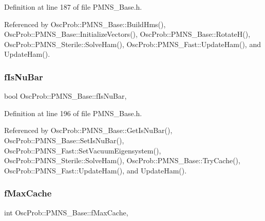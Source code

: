 Definition at line 187 of file P\+M\+N\+S\+\_\+\+Base.\+h.



Referenced by Osc\+Prob\+::\+P\+M\+N\+S\+\_\+\+Base\+::\+Build\+Hms(), Osc\+Prob\+::\+P\+M\+N\+S\+\_\+\+Base\+::\+Initialize\+Vectors(), Osc\+Prob\+::\+P\+M\+N\+S\+\_\+\+Base\+::\+Rotate\+H(), Osc\+Prob\+::\+P\+M\+N\+S\+\_\+\+Sterile\+::\+Solve\+Ham(), Osc\+Prob\+::\+P\+M\+N\+S\+\_\+\+Fast\+::\+Update\+Ham(), and Update\+Ham().

\mbox{\label{classOscProb_1_1PMNS__Base_a0ebaeaefab36a3ff381c6293faedfdd6}} 
\subsubsection{\texorpdfstring{f\+Is\+Nu\+Bar}{fIsNuBar}}
{\footnotesize\ttfamily bool Osc\+Prob\+::\+P\+M\+N\+S\+\_\+\+Base\+::f\+Is\+Nu\+Bar\hspace{0.3cm}{\ttfamily [protected]}, {\ttfamily [inherited]}}



Definition at line 196 of file P\+M\+N\+S\+\_\+\+Base.\+h.



Referenced by Osc\+Prob\+::\+P\+M\+N\+S\+\_\+\+Base\+::\+Get\+Is\+Nu\+Bar(), Osc\+Prob\+::\+P\+M\+N\+S\+\_\+\+Base\+::\+Set\+Is\+Nu\+Bar(), Osc\+Prob\+::\+P\+M\+N\+S\+\_\+\+Fast\+::\+Set\+Vacuum\+Eigensystem(), Osc\+Prob\+::\+P\+M\+N\+S\+\_\+\+Sterile\+::\+Solve\+Ham(), Osc\+Prob\+::\+P\+M\+N\+S\+\_\+\+Base\+::\+Try\+Cache(), Osc\+Prob\+::\+P\+M\+N\+S\+\_\+\+Fast\+::\+Update\+Ham(), and Update\+Ham().

\mbox{\label{classOscProb_1_1PMNS__Base_a74c13356eafec2490d8c3c19759ba7f0}} 
\subsubsection{\texorpdfstring{f\+Max\+Cache}{fMaxCache}}
{\footnotesize\ttfamily int Osc\+Prob\+::\+P\+M\+N\+S\+\_\+\+Base\+::f\+Max\+Cache\hspace{0.3cm}{\ttfamily [protected]}, {\ttfamily [inherited]}}



